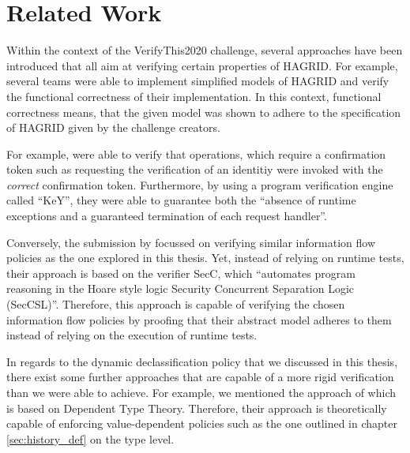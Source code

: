 
\section{Related Work}
\label{sec:related_work}

Within the context of the VerifyThis2020 challenge, several approaches have been introduced that all aim at verifying certain properties of HAGRID.
For example, several teams were able to implement simplified models of HAGRID and verify the functional correctness of their implementation. In this context, functional correctness means, that the given model was shown to adhere to the specification of HAGRID given by the challenge creators. 

For example, \citeauthor{VTLTC2020/KeY} were able to verify that operations, which require a confirmation token such as requesting  the verification of an identitiy were invoked with the \emph{correct} confirmation token. Furthermore, by using a program verification engine called ``KeY'', they were able to guarantee both the ``absence of runtime exceptions and a guaranteed termination of each request handler''\cite{VTLTC2020/KeY}.

Conversely, the submission by \citeauthor{VTLTC2020/IFVerify} focussed on verifying similar information flow policies as the one explored in this thesis. Yet, instead of relying on runtime tests, their approach is based on the verifier SecC, which ``automates program reasoning in the Hoare style logic Security Concurrent Separation Logic (SecCSL)''\cite{VTLTC2020/IFVerify}. Therefore, this approach is capable of verifying the chosen information flow policies by proofing that their abstract model adheres to them instead of relying on the execution of runtime tests. 

\bigskip
In regards to the dynamic declassification policy that we discussed in this thesis, there exist some further approaches that are capable of a more rigid verification than we were able to achieve. For example, we mentioned the approach of \citeauthor{Lourenco_Caires_15} which is based on Dependent Type Theory. Therefore, their approach is theoretically capable of enforcing value-dependent policies such as the one outlined in chapter \ref{sec:history_def} on the type level.